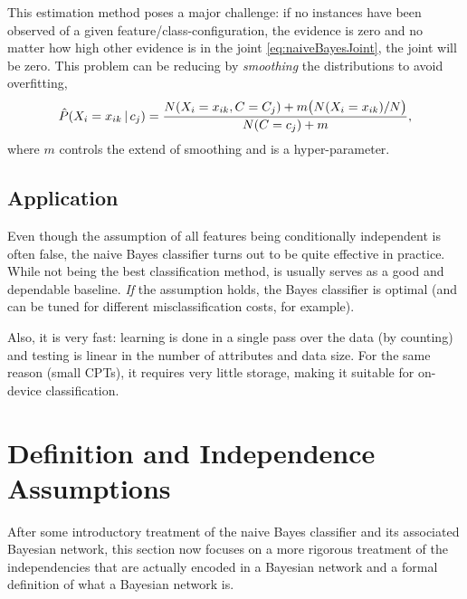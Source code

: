 			This estimation method poses a major challenge: if no instances have been observed of a given feature/class-configuration, the evidence is zero and no matter how high other evidence is in the joint \eqref{eq:naiveBayesJoint}, the joint will be zero. This problem can be reducing by \emph{smoothing} the distributions to avoid overfitting,
			\begin{equation}
				\hat{P}(X_i = x_{ik} \,\vert\, c_j) = \frac{N(X_i = x_{ik}, C = C_j) + m \bigl( N(X_i = x_{ik}) / N \bigr)}{N(C = c_j) + m},
			\end{equation}
			where \(m\) controls the extend of smoothing and is a hyper-parameter.

		\subsection{Application}
			Even though the assumption of all features being conditionally independent is often false, the naive Bayes classifier turns out to be quite effective in practice. While not being the best classification method, is usually serves as a good and dependable baseline. \emph{If} the assumption holds, the Bayes classifier is optimal (and can be tuned for different misclassification costs, for example).

			Also, it is very fast: learning is done in a single pass over the data (by counting) and testing is linear in the number of attributes and data size. For the same reason (small CPTs), it requires very little storage, making it suitable for on-device classification.

	\section{Definition and Independence Assumptions}
		After some introductory treatment of the naive Bayes classifier and its associated Bayesian network, this section now focuses on a more rigorous treatment of the independencies that are actually encoded in a Bayesian network and a formal definition of what a Bayesian network is.

